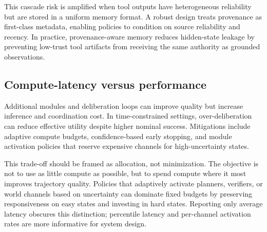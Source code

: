\documentclass[pdflatex,sn-mathphys-num]{sn-jnl}
\begin{document}
This cascade risk is amplified when tool outputs have heterogeneous reliability but are stored in a uniform memory format. A robust design treats provenance as first-class metadata, enabling policies to condition on source reliability and recency. In practice, provenance-aware memory reduces hidden-state leakage by preventing low-trust tool artifacts from receiving the same authority as grounded observations.

\subsection{Compute-latency versus performance}
Additional modules and deliberation loops can improve quality but increase inference and coordination cost. In time-constrained settings, over-deliberation can reduce effective utility despite higher nominal success. Mitigations include adaptive compute budgets, confidence-based early stopping, and module activation policies that reserve expensive channels for high-uncertainty states.

This trade-off should be framed as allocation, not minimization. The objective is not to use as little compute as possible, but to spend compute where it most improves trajectory quality. Policies that adaptively activate planners, verifiers, or world channels based on uncertainty can dominate fixed budgets by preserving responsiveness on easy states and investing in hard states. Reporting only average latency obscures this distinction; percentile latency and per-channel activation rates are more informative for system design.
\end{document}
